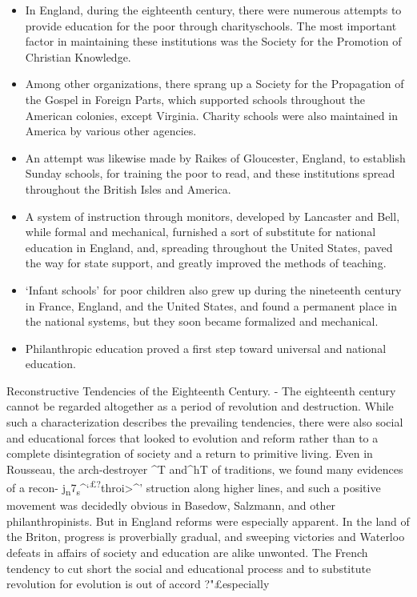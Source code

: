 \documentclass[]{book}
\providecommand{\tightlist}{%
  \setlength{\itemsep}{0pt}\setlength{\parskip}{0pt}}
\begin{document}
\begin{itemize}
\tightlist
\item
  In England, during the eighteenth century, there were numerous attempts to provide education for the poor through charityschools. The most important factor in maintaining these institutions was the Society for the Promotion of Christian Knowledge.
\item
  Among other organizations, there sprang up a Society for the Propagation of the Gospel in Foreign Parts, which supported schools throughout the American colonies, except Virginia. Charity schools were also maintained in America by various other agencies.
\item
  An attempt was likewise made by Raikes of Gloucester, England, to establish Sunday schools, for training the poor to read, and these institutions spread throughout the British Isles and America.
\item
  A system of instruction through monitors, developed by Lancaster and Bell, while formal and mechanical, furnished a sort of substitute for national education in England, and, spreading throughout the United States, paved the way for state support, and greatly improved the methods of teaching.
\item
  `Infant schools' for poor children also grew up during the nineteenth century in France, England, and the United States, and found a permanent place in the national systems, but they soon became formalized and mechanical.
\item
  Philanthropic education proved a first step toward universal and national education.
\end{itemize}

Reconstructive Tendencies of the Eighteenth Century. - The eighteenth century cannot be regarded altogether as a period of revolution and destruction. While\protect\hypertarget{ch20.xmlux5cux23para.290.1.0.box.130.254.1263.798.q.60}{}{ such a characterization describes the prevailing tendencies, there were also social and educational forces that looked to evolution and reform rather than to a complete disintegration of society and a return to primitive living. Even in Rousseau, the arch-destroyer \^{}T and\^{}hT of traditions, we found many evidences of a recon- j\textsubscript{n}7\textsubscript{s}\^{}`\textsuperscript{£?}throi\textgreater{}\^{}' struction along higher lines, and such a positive movement was decidedly obvious in Basedow, Salzmann, and other philanthropinists. But in England reforms were especially apparent. In the land of the Briton, progress is proverbially gradual, and sweeping victories and Waterloo defeats in affairs of society and education are alike unwonted. The French tendency to cut short the social and educational process and to substitute revolution for evolution is out of accord ?"£especially}
\end{document}
